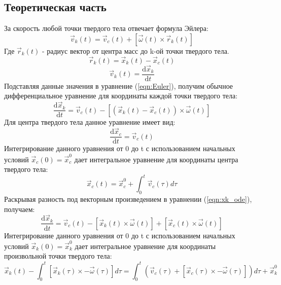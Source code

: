 \documentclass[12pt,a4paper]{article}
\begin{document}
\subsection{Теоретическая часть}
За скорость любой точки твердого тела отвечает формула Эйлера:
\begin{equation}
\label{eqn:Euler}
\overrightarrow{v}_k(t)=\overrightarrow{v}_c(t)+[\overrightarrow{\omega}(t)\times\overrightarrow{r}_k(t)]
\end{equation}
Где $\overrightarrow{r}_k(t)$ - радиус вектор от центра масс до k-ой точки твердого тела.
\begin{equation}
\overrightarrow{r}_k(t)=\overrightarrow{x}_k(t)-\overrightarrow{x}_c(t)
\end{equation}
\begin{equation}
\overrightarrow{v}_k(t)=\frac{\text{d}\overrightarrow{x}_k}{\text{d}t}
\end{equation}
Подставляя данные значения в уравнение (\ref{eqn:Euler}), получим обычное дифференциальное уравнение для координаты каждой точки твердого тела:
\begin{equation}
\label{eqn:xk_ode}
\frac{\text{d}\overrightarrow{x}_k}{\text{d}t}=\overrightarrow{v}_c(t)-[(\overrightarrow{x}_k(t)-\overrightarrow{x}_c(t))\times\overrightarrow{\omega}(t)]
\end{equation}
Для центра твердого тела данное уравнение имеет вид:
\begin{equation}
\label{eqn:xc_ode}
\frac{\text{d}\overrightarrow{x}_c}{\text{d}t}=\overrightarrow{v}_c(t)
\end{equation}
Интегрирование данного уравнения от 0 до t с использованием начальных условий $\overrightarrow{x}_c(0) = \overrightarrow{x}_c^0$ дает интегральное уравнение для координаты центра твердого тела:
\begin{equation}
\label{eqn:xc_ie}
\overrightarrow{x}_c(t) = \overrightarrow{x}_c^0+\int_{0}^{t} \overrightarrow{v}_c(\tau)d\tau
\end{equation}
Раскрывая разность под векторным произведением в уравнении (\ref{eqn:xk_ode}), получаем:
\[
\frac{\text{d}\overrightarrow{x}_k}{\text{d}t}=\overrightarrow{v}_c(t)-[\overrightarrow{x}_k(t)\times\overrightarrow{\omega}(t)]+[\overrightarrow{x}_c(t)\times\overrightarrow{\omega}(t)]
\] 
Интегрирование данного уравнения от 0 до t с использованием начальных условий $\overrightarrow{x}_k(0) = \overrightarrow{x}_k^0$ дает интегральное уравнение для координаты произвольной точки твердого тела:
\begin{equation}
\label{eqn:xk_ie}
\overrightarrow{x}_k(t)-\int_{0}^{t} [\overrightarrow{x}_k(\tau)\times-\overrightarrow{\omega}(\tau)] d\tau
= 
\int_{0}^{t}(\overrightarrow{v}_c(\tau)+[\overrightarrow{x}_c(\tau)\times-\overrightarrow{\omega}(\tau)])d\tau+\overrightarrow{x}_k^0
\end{equation}
\end{document}
